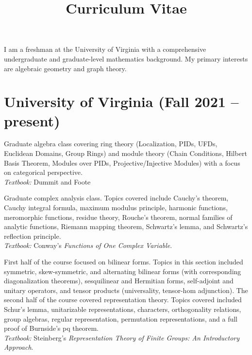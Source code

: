 \documentclass[11pt,letterpaper,sans]{moderncv}
\title{Curriculum Vitae}
\begin{document}
\makecvtitle %
\vspace*{-1.5em}



\begin{center}
  I am a freshman at the University of Virginia with a comprehensive undergraduate and graduate-level mathematics background. My primary interests are algebraic geometry and graph theory.
\end{center}

\section{University of Virginia (Fall 2021 -- present)}

%
  {Graduate algebra class covering ring theory (Localization, PIDs, UFDs, Euclidean Domains, Group Rings) and module theory (Chain Conditions, Hilbert Basis Theorem, Modules over PIDs, Projective/Injective Modules) with a focus on categorical perspective.   \\ \emph{Textbook: }Dummit and Foote}

%
  {Graduate complex analysis class. Topics covered include Cauchy’s theorem, Cauchy integral formula, maximum modulus principle, harmonic functions, meromorphic functions, residue theory, Rouche's theorem, normal families of analytic functions, Riemann mapping theorem, Schwartz's lemma, and Schwartz's reflection principle. \\ \emph{Textbook: }Conway's \emph{Functions of One Complex Variable}.}

%
  {First half of the course focused on bilinear forms. Topics in this section included symmetric, skew-symmetric, and alternating bilinear forms (with corresponding diagonalization theorems), sesquilinear and Hermitian forms, self-adjoint and unitary operators, and tensor products (universality, tensor-hom adjunction). The second half of the course covered representation theory. Topics covered included Schur's lemma, unitarizable representations, characters, orthogonality relations, group algebras, regular representation, permutation representations, and a full proof of Burnside's pq theorem. \\ \emph{Textbook: }Steinberg's \emph{Representation Theory of Finite Groups: An Introductory Approach}.}
\end{document}
